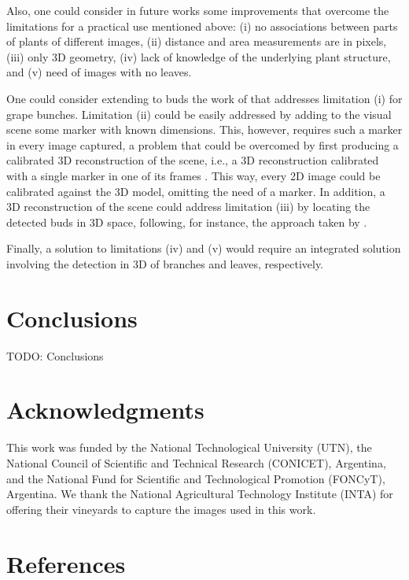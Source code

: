 \documentclass[a4paper,authoryear,review]{elsarticle}
\begin{document}
%



Also, one could consider in future works some improvements that overcome the limitations for a practical use mentioned above: (i) no associations between parts of plants of different images, (ii) distance and area measurements are in pixels, (iii) only 3D geometry, (iv) lack of knowledge of the underlying plant structure, and (v) need of images with no leaves.

One could consider extending to buds the work of \cite{santos2020grape} that addresses limitation (i) for grape bunches. 
%
Limitation (ii) could be easily addressed by adding to the visual scene some marker with known dimensions. This, however, requires such a marker in every image captured, a problem that could be overcomed by first producing a calibrated 3D reconstruction of the scene, i.e., a 3D reconstruction calibrated with a single marker in one of its frames \cite{REF DE 3D RECONSTRUCTION}. This way, every 2D image could be calibrated against the 3D model, omitting the need of a marker. In addition, a 3D reconstruction of the scene could address limitation (iii) by locating the detected buds in 3D space, following, for instance, the approach taken by \cite{diaz2018grapevine}.

%
Finally, a solution to limitations (iv) and (v) would require an integrated solution involving the detection in 3D of branches and leaves, respectively. 


\section{Conclusions} \label{sec:conclusion}
TODO: Conclusions
\section*{Acknowledgments}

This work was funded by the National Technological University (UTN), the National Council of Scientific and Technical Research (CONICET), Argentina, and the National Fund for Scientific and Technological Promotion (FONCyT), Argentina. We thank the National Agricultural Technology Institute (INTA) for offering their vineyards to capture the images used in this work.

\section*{References}

\end{document}
